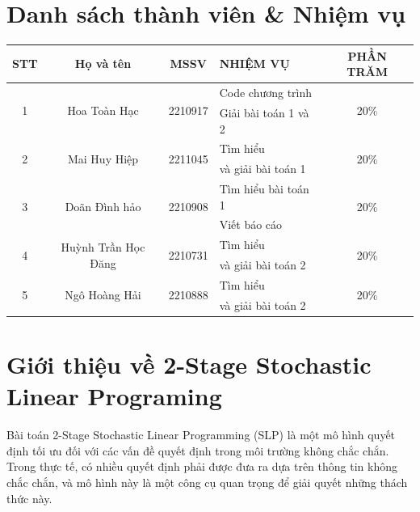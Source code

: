 \documentclass[a4paper]{article}
\begin{document}

\newpage
\renewcommand*\contentsname{Mục lục}
\tableofcontents
\newpage
\listoffigures
\listoftables
\newpage
\section{Danh sách thành viên \& Nhiệm vụ }

\begin{center}
\begin{tabular}{|c|c|c|l|c|}
\hline
\textbf{STT} & \textbf{Họ và tên} & \textbf{MSSV} & \textbf{NHIỆM VỤ  } & \textbf{PHẦN TRĂM}\\
\hline 
\multirow{2}{*}{1} & \multirow{2}{*}{Hoa Toàn Hạc} & \multirow{2}{*}{2210917} & Code chương trình  & \multirow{2}{*}{20\%}\\
 & &  & Giải bài toán  1 và 2 &\\
\hline 
\multirow{2}{*}{2} & \multirow{2}{*}{Mai Huy Hiệp} & \multirow{2}{*}{2211045} & Tìm hiểu & \multirow{2}{*}{20\%}\\
 & &  & và giải bài toán 1 &\\
\hline 
\multirow{2}{*}{3} & \multirow{2}{*}{Doãn Đình hảo} & \multirow{2}{*}{2210908} & Tìm hiểu bài toán 1& \multirow{2}{*}{20\%}\\
 & &  & Viết báo cáo  &\\
\hline 
\multirow{2}{*}{4} & \multirow{2}{*}{Huỳnh Trần Học Đăng} & \multirow{2}{*}{2210731} &Tìm hiểu & \multirow{2}{*}{20\%}\\
 & &  & và giải bài toán 2  &\\
\hline 
\multirow{2}{*}{5} & \multirow{2}{*}{Ngô Hoàng Hải} & \multirow{2}{*}{2210888} & Tìm hiểu & \multirow{2}{*}{20\%}\\
 & &  & và giải bài toán 2  &\\
\hline
\end{tabular}
\end{center}

\section{Giới thiệu về 2-Stage Stochastic Linear Programing}

Bài toán 2-Stage Stochastic Linear Programming (SLP) là một mô hình quyết định tối ưu đối với các vấn đề quyết định trong môi trường không chắc chắn. Trong thực tế, có nhiều quyết định phải được đưa ra dựa trên thông tin không chắc chắn, và mô hình này là một công cụ quan trọng để giải quyết những thách thức này.
\end{document}

